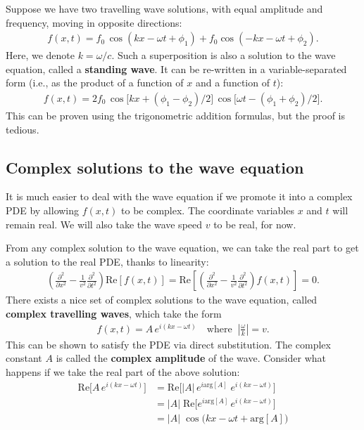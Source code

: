 \documentclass[10pt,a4paper]{article}
\begin{document}
Suppose we have two travelling wave solutions, with equal amplitude
and frequency, moving in opposite directions:
\begin{align}
  f(x,t) = f_0 \, \cos(kx - \omega t + \phi_1) + f_0 \cos(-kx - \omega t + \phi_2).
\end{align}
Here, we denote $k = \omega/c$.  Such a superposition is also a
solution to the wave equation, called a \textbf{standing wave}. It can
be re-written in a variable-separated form (i.e., as the product of a
function of $x$ and a function of $t$):
\begin{align}
  f(x,t) = 2f_0 \, \cos\big[kx + (\phi_1-\phi_2)/2\big]\, \cos\big[\omega t - (\phi_1+\phi_2)/2\big].
  \label{eq:standing}
\end{align}
This can be proven using the trigonometric addition formulas, but the
proof is tedious.

\subsection{Complex solutions to the wave equation}
\label{complex-solutions-to-the-wave-equation}

It is much easier to deal with the wave equation if we promote it into
a complex PDE by allowing $f(x,t)$ to be complex. The coordinate
variables $x$ and $t$ will remain real. We will also take the wave
speed $v$ to be real, for now.

From any complex solution to the wave equation, we can take the real
part to get a solution to the real PDE, thanks to linearity:
\begin{align}
  \left(\frac{\partial^2}{\partial x^2} - \frac{1}{v^2} \frac{\partial^2}{\partial t^2}\right) \mathrm{Re}\left[f(x,t)\right] = \mathrm{Re} \left[ \left(\frac{\partial^2}{\partial x^2} - \frac{1}{v^2} \frac{\partial^2}{\partial t^2}\right) f(x,t)\right] = 0.
\end{align}
There exists a nice set of complex solutions to the wave equation,
called \textbf{complex travelling waves}, which take the form
\begin{align}
  f(x,t) = A \, e^{i(kx - \omega t)} \quad\mathrm{where}\;\; \left|\frac{\omega}{k}\right| = v.
\end{align}
This can be shown to satisfy the PDE via direct substitution.  The
complex constant $A$ is called the \textbf{complex amplitude} of the
wave. Consider what happens if we take the real part of the above
solution:
\begin{align}
  \mathrm{Re}\Big[A \, e^{i(kx - \omega t)}\Big] &= \mathrm{Re}\Big[ |A|\, e^{i\mathrm{arg}[A]} \; e^{i(kx - \omega t)}\Big] \\
  &= |A|\; \mathrm{Re}\Big[ e^{i\mathrm{arg}[A]} \, e^{i(kx - \omega t)}\Big] \\
  &= |A|\; \cos\!\big(kx - \omega t + \mathrm{arg}[A]\big)
\end{align}
\end{document}
